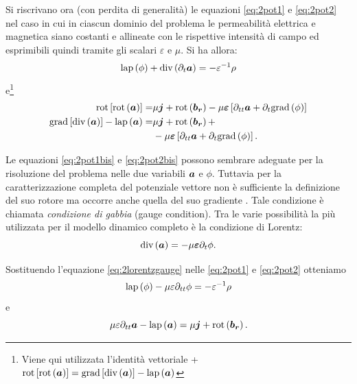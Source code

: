 Si riscrivano ora (con perdita di generalità) le equazioni \eqref{eq:2pot1} e \eqref{eq:2pot2} nel caso in cui in ciascun dominio del problema le permeabilità elettrica e magnetica siano costanti e allineate con le rispettive intensità di campo ed esprimibili quindi tramite gli scalari $\varepsilon$ e $\mu$.
Si ha allora:
\begin{align}
\label{eq:2pot1bis}
\text{lap}\left(\phi\right)+\text{div}\left( \partial_t \boldsymbol{a} \right) = -\varepsilon^{-1}\rho
\end{align}
e\footnote{Viene qui utilizzata l'identità vettoriale +$\text{rot}\left[\text{rot}\left(\boldsymbol{a}\right)\right]=\text{grad}\left[\text{div}\left(\boldsymbol{a}\right)\right]-\text{lap}\left(\boldsymbol{a}\right)$}
\begin{align}
\label{eq:2pot2bis}
\text{rot} \left[\text{rot}\left(\boldsymbol{a}\right) \right] =& \mu\boldsymbol{j}+\text{rot}\left(\boldsymbol{b_r}\right)-\mu\boldsymbol{\varepsilon}\left[\partial_{tt}\boldsymbol{a}+\partial_t \text{grad}\left(\phi\right)\right]\nonumber\\
\text{grad}\left[\text{div}\left(\boldsymbol{a}\right)\right]-\text{lap}\left(\boldsymbol{a}\right) =& \mu\boldsymbol{j}+\text{rot}\left(\boldsymbol{b_r}\right)+\nonumber\\
&-\mu\boldsymbol{\varepsilon}\left[\partial_{tt}\boldsymbol{a}+\partial_t \text{grad}\left(\phi\right)\right].
\end{align}

Le equazioni \eqref{eq:2pot1bis} e \eqref{eq:2pot2bis} possono sembrare adeguate per la risoluzione del problema nelle due variabili $\boldsymbol{a}$ e ${\phi}$. Tuttavia per la caratterizzazione completa del potenziale vettore non è sufficiente la definizione del suo rotore ma occorre anche quella del suo gradiente \citep{griffiths_introduction_2013}. Tale condizione è chiamata \textit{condizione di gabbia} (gauge condition). Tra le varie possibilità la più utilizzata per il modello dinamico completo è la condizione di Lorentz:
\begin{equation}
\label{eq:2lorentzgauge}
\text{div}\left(\boldsymbol{a}\right) = -\mu\boldsymbol{\varepsilon}\partial_{t} \phi.
\end{equation}

Sostituendo l'equazione \eqref{eq:2lorentzgauge} nelle \eqref{eq:2pot1} e \eqref{eq:2pot2} otteniamo
\begin{equation}
\label{eq:2pot3}
\text{lap}\left({\phi}\right)-\mu\varepsilon\partial_{tt}\phi = -\varepsilon^{-1} \rho
\end{equation}
e
\begin{equation}
\label{eq:2pot4}
\mu\varepsilon\partial_{tt}\boldsymbol{a}-\text{lap}\left(\boldsymbol{a}\right) = \mu\boldsymbol{j}+\text{rot}\left(\boldsymbol{b_r}\right).
\end{equation}
